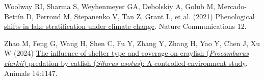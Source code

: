 \documentclass[
  letterpaper,
  DIV=11,
  numbers=noendperiod]{scrartcl}
\newlength{\cslhangindent}
\newenvironment{CSLReferences}[2] %
 {\begin{list}{}{%
  \setlength{\itemindent}{0pt}
  \setlength{\leftmargin}{0pt}
  \setlength{\parsep}{0pt}
  \ifodd #1
   \setlength{\leftmargin}{\cslhangindent}
   \setlength{\itemindent}{-1\cslhangindent}
  \fi
  \setlength{\itemsep}{#2\baselineskip}}}
 {\end{list}}
\begin{document}
\begin{CSLReferences}{1}{1}
Woolway RI, Sharma S, Weyhenmeyer GA, Debolskiy A, Golub M,
Mercado-Bettín D, Perroud M, Stepanenko V, Tan Z, Grant L, et al. (2021)
\href{https://doi.org/10.1038/s41467-021-22657-4}{Phenological shifts in
lake stratification under climate change}. Nature Communications 12.

Zhao M, Feng G, Wang H, Shen C, Fu Y, Zhang Y, Zhang H, Yao Y, Chen J,
Xu W (2024) \href{https://doi.org/10.3390/ani14081147}{The influence of
shelter type and coverage on crayfish ({\emph{Procambarus clarkii}})
predation by catfish ({\emph{Silurus asotus}}): A controlled environment
study}. Animals 14:1147.

\end{CSLReferences}
\end{document}
